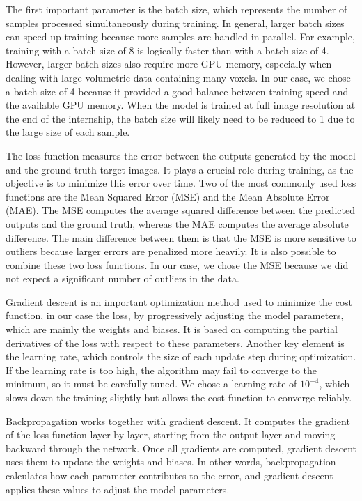 \documentclass[12pt]{article}
\begin{document}
The first important parameter is the batch size, which represents the number of samples processed simultaneously during training. In general,
larger batch sizes can speed up training because more samples are handled in parallel. For example, training with a batch size of 8 is logically
faster than with a batch size of 4.
However, larger batch sizes also require more GPU memory, especially when dealing with large volumetric data containing many voxels. In our case,
we chose a batch size of 4 because it provided a good balance between training speed and the available GPU memory.
When the model is trained at full image resolution at the end of the internship, the batch size will likely need to be reduced
to 1 due to the large size of each sample.
\vspace{0.5cm}

The loss function measures the error between the outputs generated by the model and the ground truth target images. It plays a crucial role during
training, as the objective is to minimize this error over time.
Two of the most commonly used loss functions are the Mean Squared Error (MSE) and the Mean Absolute Error (MAE). The MSE computes the average squared
difference between the predicted outputs and the ground truth, whereas the MAE computes the average absolute difference. The main difference between
them is that the MSE is more sensitive to outliers because larger errors are penalized more heavily.
It is also possible to combine these two loss functions. In our case, we chose the MSE because we did not expect a significant number of outliers in the data.
\vspace{0.5cm}

Gradient descent is an important optimization method used to minimize the cost function, in our case the loss, by progressively adjusting the model parameters, which are mainly the weights and biases.
It is based on computing the partial derivatives of the loss with respect to these parameters. Another key element is the learning rate,
which controls the size of each update step during optimization. If the learning rate is too high, the algorithm may fail to converge to the minimum, so
it must be carefully tuned. We chose a learning rate of $10^{-4}$, which slows down the training slightly but allows the cost function to converge reliably.
\vspace{0.5cm}

Backpropagation works together with gradient descent. It computes the gradient of the loss function layer by layer, starting from the output layer and moving
backward through the network. Once all gradients are computed, gradient descent uses them to update the weights and biases.
In other words, backpropagation calculates how each parameter contributes to the error, and gradient descent applies these values to adjust the model
parameters.
\vspace{0.5cm}
\end{document}
